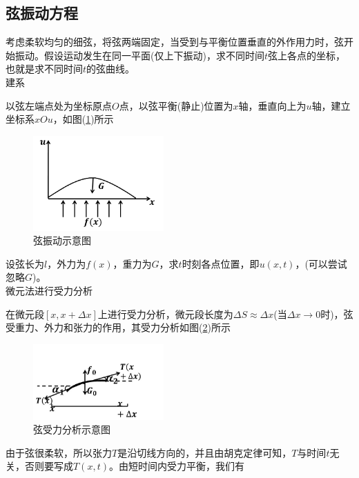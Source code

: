     \subsection{弦振动方程}
        \label{sub:弦振动方程}
        \par
        考虑柔软均匀的细弦，将弦两端固定，当受到与平衡位置垂直的外作用力时，弦开始振动。假设运动发生在同一平面(仅上下振动)，求不同时间$t$弦上各点的坐标，也就是求不同时间$t$的弦曲线。\\
        建系
        \par
        以弦左端点处为坐标原点$O$点，以弦平衡(静止)位置为$x$轴，垂直向上为$u$轴，建立坐标系$xOu$，如图(\ref{fig:弦振动示意图})所示
		\begin{figure}[H]
    		\centering
    		\includegraphics[width=5cm]{images/string_vibration.jpg}
    		\caption{弦振动示意图}
    		\label{fig:弦振动示意图}
		\end{figure}
        \par
        设弦长为$l$，外力为$f(x)$，重力为$G$，求$t$时刻各点位置，即$u(x,t)$，(可以尝试忽略$G$)。\\
        微元法进行受力分析
        \par
        在微元段$[x,x+\Delta x]$上进行受力分析，微元段长度为$\Delta S \approx \Delta x$(当$\Delta x \rightarrow 0$时)，弦受重力、外力和张力的作用，其受力分析如图(\ref{fig:弦受力分析示意图})所示
		\begin{figure}[H]
		\centering
		\includegraphics[width=5cm]{images/string_force_analysis.jpg}
		\caption{弦受力分析示意图}
		\label{fig:弦受力分析示意图}
		\end{figure}
        由于弦很柔软，所以张力$T$是沿切线方向的，并且由胡克定律可知，$T$与时间$t$无关，否则要写成$T(x,t)$。由短时间内受力平衡，我们有
